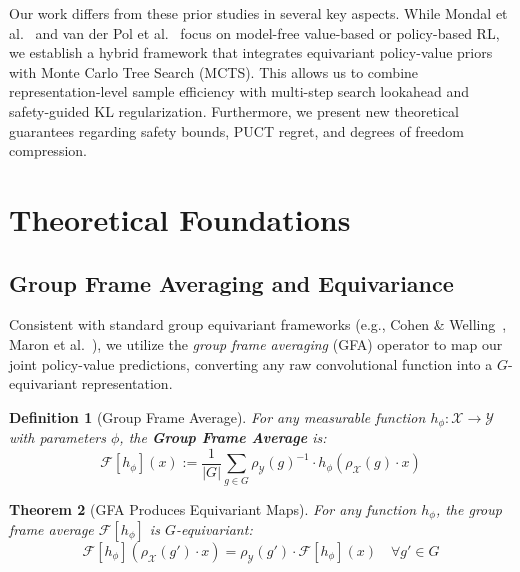 \documentclass{article}
\newtheorem{theorem}{Theorem}[section]
\newtheorem{definition}[theorem]{Definition}
\begin{document}
Our work differs from these prior studies in several key aspects. While Mondal et al.~\cite{mondal2020group} and van der Pol et al.~\cite{vanderpol2020mdp} focus on model-free value-based or policy-based RL, we establish a hybrid framework that integrates equivariant policy-value priors with Monte Carlo Tree Search (MCTS). This allows us to combine representation-level sample efficiency with multi-step search lookahead and safety-guided KL regularization. Furthermore, we present new theoretical guarantees regarding safety bounds, PUCT regret, and degrees of freedom compression.

\section{Theoretical Foundations}

\subsection{Group Frame Averaging and Equivariance}

Consistent with standard group equivariant frameworks (e.g., Cohen \& Welling~\cite{cohen2016group}, Maron et al.~\cite{maron2020learning}), we utilize the \emph{group frame averaging} (GFA) operator to map our joint policy-value predictions, converting any raw convolutional function into a $G$-equivariant representation.

\begin{definition}[Group Frame Average]
For any measurable function $h_\phi: \mathcal{X} \to \mathcal{Y}$ with parameters $\phi$, the \textbf{Group Frame Average} is:
\begin{equation}
    \mathcal{F}[h_\phi](x) := \frac{1}{|G|} \sum_{g \in G} \rho_\mathcal{Y}(g)^{-1} \cdot h_\phi\!\left(\rho_\mathcal{X}(g) \cdot x\right)
\end{equation}
\end{definition}

\begin{theorem}[GFA Produces Equivariant Maps]\label{thm:frame_avg}
For any function $h_\phi$, the group frame average $\mathcal{F}[h_\phi]$ is $G$-equivariant:
\begin{equation}
    \mathcal{F}[h_\phi]\!\left(\rho_\mathcal{X}(g') \cdot x\right) = \rho_\mathcal{Y}(g') \cdot \mathcal{F}[h_\phi](x) \quad \forall g' \in G
\end{equation}
\end{theorem}
\end{document}
